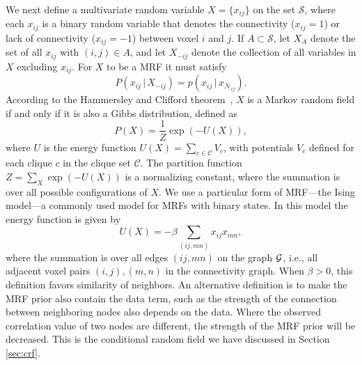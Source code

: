 We next define a multivariate random variable $X = \{ x_{ij} \}$ on the set
$\mathcal{S}$, where each $x_{ij}$ is a binary random variable that
denotes the connectivity ($x_{ij} = 1$) or lack of connectivity ($x_{ij} = -1$)
between voxel $i$ and $j$. If $A \subset \mathcal{S}$, let $X_A$ denote the
set of all $x_{ij}$ with $(i,j) \in A$, and let $X_{-ij}$ denote the
collection of all variables in $X$ excluding $x_{ij}$. For $X$ to be a
MRF it must satisfy
\begin{equation*}
  P( x_{ij} \, | \, X_{-ij}) = p(x_{ij} \, | \, x_{\mathcal{N}_{ij}}).
\end{equation*}
According to the Hammersley and Clifford theorem~\cite{besag_spatial_1974}, $X$
is a Markov random field if and only if it is also a Gibbs distribution, defined
as
\begin{equation}
  P(X) = \frac{1}{Z}\exp\left(-U(X)\right), 
\end{equation}
where $U$ is the energy function $U(X) = \sum_{c \in \mathcal{C}}
V_c$, with potentials $V_c$ defined for each clique $c$ in the clique
set $\mathcal{C}$. The partition function $Z = \sum_{X} \exp(-U(X))$
is a normalizing constant, where the summation is over all possible
configurations of $X$. We use a particular form of MRF---the
Ising model---a commonly used model for MRFs with binary states. In
this model the energy function is given by
\begin{equation}
U(X) = - \beta \sum_{( ij, mn )} x_{ij} x_{mn},
 \label{eq:A1}
\end{equation}
where the summation is over all edges $( ij, mn )$ on the graph $\mathcal{G}$, i.e., all
adjacent voxel pairs $(i,j), (m,n)$ in the connectivity graph. When $\beta > 0$,
this definition favors similarity of neighbors. An alternative definition is to
make the MRF prior also contain the data term, such as the strength of the
connection between neighboring nodes also depends on the data. Where the
observed correlation value of two nodes are different, the strength of the MRF
prior will be decreased. This is the conditional random field we have discussed
in Section \ref{sec:crf}.
